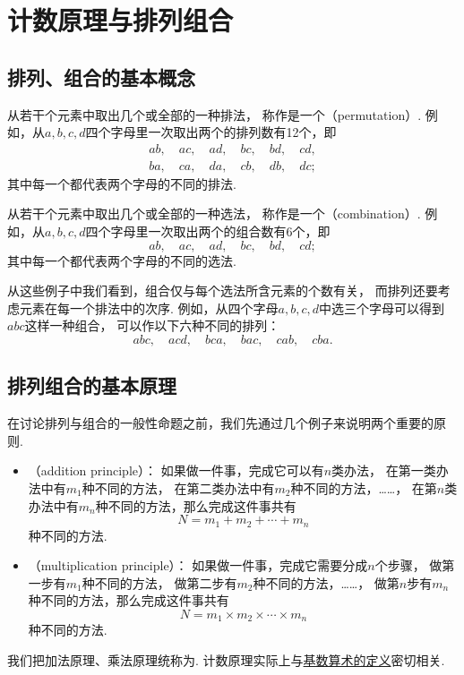 \section{计数原理与排列组合}
\subsection{排列、组合的基本概念}
从若干个元素中取出几个或全部的一种排法，
称作是一个（permutation）.
例如，从\(a,b,c,d\)四个字母里一次取出两个的排列数有12个，即\begin{gather*}
	ab, \quad
	ac, \quad
	ad, \quad
	bc, \quad
	bd, \quad
	cd, \\
	ba, \quad
	ca, \quad
	da, \quad
	cb, \quad
	db, \quad
	dc;
\end{gather*}
其中每一个都代表两个字母的不同的排法.

从若干个元素中取出几个或全部的一种选法，
称作是一个（combination）.
例如，从\(a,b,c,d\)四个字母里一次取出两个的组合数有6个，即\begin{equation*}
	ab, \quad
	ac, \quad
	ad, \quad
	bc, \quad
	bd, \quad
	cd;
\end{equation*}
其中每一个都代表两个字母的不同的选法.

从这些例子中我们看到，组合仅与每个选法所含元素的个数有关，
而排列还要考虑元素在每一个排法中的次序.
例如，从四个字母\(a,b,c,d\)中选三个字母可以得到\(abc\)这样一种组合，
可以作以下六种不同的排列：\begin{equation*}
	abc, \quad
	acd, \quad
	bca, \quad
	bac, \quad
	cab, \quad
	cba.
\end{equation*}

\subsection{排列组合的基本原理}
在讨论排列与组合的一般性命题之前，我们先通过几个例子来说明两个重要的原则.
\begin{itemize}
	\item {}（addition principle）：
	如果做一件事，完成它可以有\(n\)类办法，
	在第一类办法中有\(m_1\)种不同的方法，
	在第二类办法中有\(m_2\)种不同的方法，……，
	在第\(n\)类办法中有\(m_n\)种不同的方法，那么完成这件事共有\begin{equation*}
		N = m_1 + m_2 + \dotsb + m_n
	\end{equation*}种不同的方法.

	\item {}（multiplication principle）：
	如果做一件事，完成它需要分成\(n\)个步骤，
	做第一步有\(m_1\)种不同的方法，
	做第二步有\(m_2\)种不同的方法，……，
	做第\(n\)步有\(m_n\)种不同的方法，那么完成这件事共有\begin{equation*}
		N = m_1 \times m_2 \times \dotsm \times m_n
	\end{equation*}种不同的方法.
\end{itemize}
我们把加法原理、乘法原理统称为.
计数原理实际上与\hyperref[definition:基数.基数算术的定义]{基数算术的定义}密切相关.

